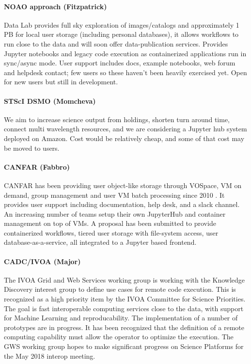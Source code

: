 \documentclass[11pt,twoside]{article}
\begin{document}
\paragraph*{NOAO approach (Fitzpatrick)} Data Lab \citep{2016SPIE.9913E..0LF} provides full sky exploration of images/catalogs and approximately 1 PB for local user storage (including personal databases), it allows workflows to run close to the data and will soon offer data-publication services. Provides Jupyter notebooks and legacy code execution as containerized applications run in sync/async mode. User support includes docs, example notebooks, web forum and helpdesk contact; few users so these haven't been heavily exercised yet.  Open for new users but still in development.

\paragraph*{STScI DSMO (Momcheva)} We aim to increase science output from holdings, shorten turn around time, connect multi wavelength resources, and we are considering a Jupyter hub system deployed on Amazon. Cost would be relatively cheap, and some of that cost may be moved to users.

\paragraph*{CANFAR (Fabbro)} CANFAR has been providing user object-like storage through VOSpace, VM on demand, group management and user VM batch processing since 2010 \citep{2010SPIE.7740E..1IG}. It provides user support including documentation, help desk, and a slack channel. An increasing number of teams setup their own JupyterHub and container management on top of VMs. A proposal has been submitted to provide containerized workflows, tiered user storage with file-system access, user database-as-a-service, all integrated to a Jupyter based frontend.

\paragraph*{CADC/IVOA (Major)} The IVOA Grid and Web Services working group is working with the Knowledge Discovery interest group to define use cases for remote code execution.  This is recognized as a high priority item by the IVOA Committee for Science Priorities.  The goal is fast interoperable computing services close to the data, with support for Machine Learning and reproducability.  The implementation of a number of prototypes are in progress.  It has been recognized that the definition of a remote computing capability must allow the operator to optimize the execution.  The GWS working group hopes to make significant progress on Science Platforms for the May 2018 interop meeting.
\end{document}

